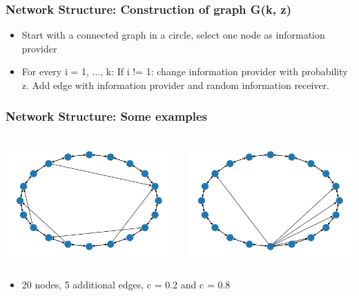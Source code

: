 \documentclass{beamer}
\begin{document}
\begin{frame}
\frametitle{Network Structure: Construction of graph G(k, z)}
\begin{itemize}
\item Start with a connected graph in a circle, select one node as information provider
\item For every i = 1, ..., k: If i != 1: change information provider with probability z. Add edge with information provider and random information receiver.
\end{itemize}
\end{frame}

\begin{frame}
\frametitle{Network Structure: Some examples}
\begin{columns}
    \begin{column}{.4\textwidth}
    \centering
    \includegraphics[width=.9\linewidth]{images/example2.png}
    \end{column}
    \begin{column}{.4\textwidth}
    \centering
    \includegraphics[width=.9\linewidth]{images/example8.png}
    \end{column}
\end{columns}
\begin{itemize}
    \item 20 nodes, 5 additional edges, c = 0.2 and c = 0.8
\end{itemize}
\end{frame}
\end{document}
